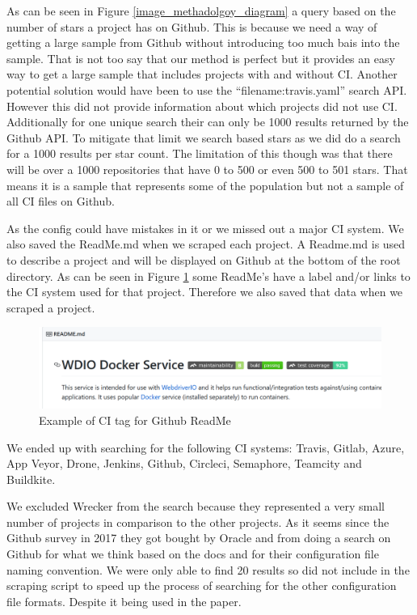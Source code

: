 \documentclass[10pt,conference]{IEEEtran}
\begin{document}
As can be seen in Figure \ref{image_methadolgoy_diagram} a query based on the number of stars a project has on Github. This is because we need a way of getting a large sample from Github without introducing too much bais into the sample. That is not too say that our method is perfect but it provides an easy way to get a large sample that includes projects with and without CI.
Another potential solution would have been to use the \enquote{filename:travis.yaml} search API. However this did not provide information about which projects did not use CI. Additionally for one unique search their can only be 1000 results returned by the Github API. To mitigate that limit we search based stars as we did do a search for a 1000 results per star count. The limitation of this though was that there will be over a 1000 repositories that have 0 to 500 or even 500 to 501 stars. That means it is a sample that represents some of the population but not a sample of all CI files on Github. 

As the config could have mistakes in it or we missed out a major CI system. We also saved the ReadMe.md when we scraped each project. A Readme.md is used to describe a project and will be displayed on Github at the bottom of the root directory. As can be seen in Figure \ref{ExampleGithubReadme} some ReadMe's have a label and/or links to the CI system used for that project. Therefore we also saved that data when we scraped a project. 

\begin{figure}[h]
  \centering
  \includegraphics[scale=0.5, width=\textwidth]{2020-01-30-08-29-04.png}
  
  \caption[alt text]{Example of CI tag for Github ReadMe \cite{GithubReadMeExample}}
  \label{ExampleGithubReadme}
\end{figure}

We ended up with searching for the following CI systems: Travis, Gitlab, Azure, App Veyor, Drone, Jenkins, Github, Circleci, Semaphore, Teamcity and Buildkite. 

We excluded Wrecker from the search because they represented a very small number of projects in comparison to the other projects. As it seems since the Github survey in 2017 they got bought by Oracle and from doing a search on Github for what we think based on the docs \cite{WreckerDocs} and \cite{WreckerOpenSourceGithubSearch} for their configuration file naming convention. We were only able to find 20 results so did not include in the scraping script to speed up the process of searching for the other configuration file formats. Despite it being used in the \citet{Hilton2016} paper.
\end{document}
